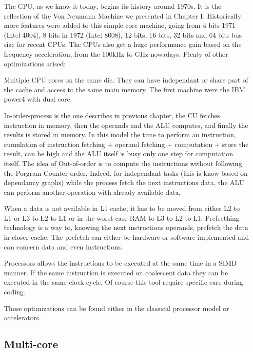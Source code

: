 The CPU, as we know it today, begins its history around 1970s.
It is the reflection of the Von Neumann Machine we presented in Chapter I. 
Historically more features were added to this simple core machine, going from 4 bits 1971 (Intel 4004), 8 bits in 1972 (Intel 8008), 12 bits, 16 bits, 32 bits and 64 bits bus size for recent CPUs. 
The CPUs also get a huge performance gain based on the frequency acceleration, from the 100kHz to GHz nowadays. 
Plenty of other optimizations arised:
\begin{description}
	\item[Multiple CPU cores:] Multiple CPU cores on the same die. They can have independant or share part of the cache and access to the same main memory. The first machine were the IBM power4 with dual core.
	\item[In/Out-Of-Order:] In-order-process is the one describes in previous chapter, the CU fetches instruction in memory, then the operands and the ALU computes, and finally the results is stored in memory. 
	In this model the time to perform an instruction, cumulation of instruction fetching + operand fetching + computation + store the result, can be high and the ALU itself is busy only one step for computation itself. The idea of Out-of-order is to compute the instructions without following the Porgram Counter order. Indeed, for independant tasks (this is know based on dependancy graphs) while the process fetch the next instructions data, the ALU can perform another operation with already available data. 
	\item[Prefetching:] When a data is not available in L1 cache, it has to be moved from either L2 to L1 or L3 to L2 to L1 or in the worst case RAM to L3 to L2 to L1. Prefecthing technology is a way to, knowing the next instructions operands, prefetch the data in closer cache. The prefetch can either be hardware or software implemented and can concern data and even instructions.
	\item[Vectorization:] Processors allows the instructions to be executed at the same time in a SIMD manner. If the same instruction is executed on coalescent data they can be executed in the same clock cycle. 
	Of course this tool require specific care during coding. 
\end{description}
Those optimizations can be found either in the classical processor model or accelerators.  

\subsection{Multi-core}

